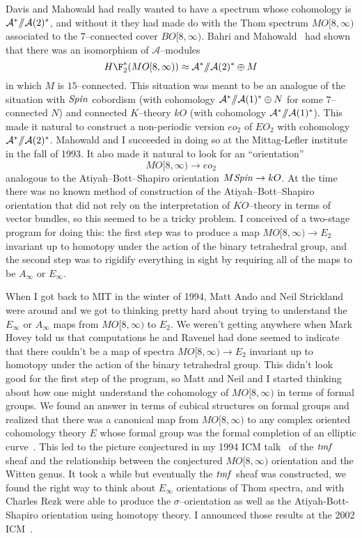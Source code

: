 Davis and Mahowald had really wanted to have a spectrum whose cohomology
is $\mathcal A^* /\!\!/ \mathcal A(2)^*$, and without it they had made do
with the Thom spectrum $MO[8, \infty)$ associated to the $7$--connected cover
$BO[8, \infty)$.  Bahri and Mahowald~\cite{BahriMahowald} had shown that
there was an isomorphism of $\mathcal A$--modules
\[
H\F_2^{\ast}(MO[8, \infty)) \approx \mathcal A^* \mmod \mathcal A(2)^* \oplus M
\]
in which $M$ is $15$--connected.  This situation was meant to be an
analogue of the situation with $\mathit{Spin}$ cobordism (with cohomology
$\mathcal A^* /\!\!/ \mathcal A(1)^* \oplus N$ for some $7$--connected $N$) and connected
$K$--theory $kO$ (with cohomology $\mathcal A^* /\!\!/ \mathcal A(1)^*$).  This made it
natural to construct a non-periodic version $eo_{2}$ of $EO_{2}$ with
cohomology $\mathcal A^* /\!\!/ \mathcal A(2)^*$.  Mahowald and I succeeded in doing so at
the Mittag-Lefler institute in the fall of 1993.  It also made it
natural to look for an ``orientation'' \[MO[8, \infty) \to eo_{2}\] analogous
to the Atiyah--Bott--Shapiro orientation $M\mathit{Spin} \to kO$.  At the time
there was no known method of construction of the Atiyah--Bott--Shapiro
orientation that did not rely on the interpretation of $KO$--theory in
terms of vector bundles, so this seemed to be a tricky problem.  I
conceived of a two-stage program for doing this: the first step was
to produce a map $MO[8, \infty) \to E_{2}$ invariant up to homotopy under
the action of the binary tetrahedral group, and the second step was to
rigidify everything in sight by requiring all of the maps to be
$A_{\infty}$ or $E_{\infty}$.

When I got back to MIT in the winter of 1994, Matt Ando and Neil
Strickland were around and we got to thinking pretty hard about trying
to understand the $E_{\infty}$ or $A_{\infty}$ maps from $MO[8, \infty)$ to
$E_{2}$.  We weren't getting anywhere when Mark Hovey told us that
computations he and Ravenel had done seemed to indicate that there
couldn't be a map of spectra $MO[8, \infty) \to E_{2}$ invariant up to
homotopy under the action of the binary tetrahedral group.  This
didn't look good for the first step of the program, so Matt and Neil
and I started thinking about how one might understand the cohomology
of $MO[8, \infty)$ in terms of formal groups.  We found an answer in terms
of cubical structures on formal groups and realized that there was a
canonical map from $MO[8, \infty)$ to any complex oriented cohomology
theory $E$ whose formal group was the formal completion of an elliptic
curve~\cite{AHSTheoremOfTheCube}.  This led to the picture
conjectured in my 1994 ICM talk~\cite{HopkinsICMZurich} of the
$\mathit{tmf}$ sheaf and the relationship between the conjectured $MO[8, \infty)$
orientation and the Witten genus.  It took a while but eventually the
$\mathit{tmf}$ sheaf was constructed, we found the right way to think about
$E_{\infty}$ orientations of Thom spectra, and with Charles Rezk were
able to produce the $\sigma$--orientation as well as the
Atiyah-Bott-Shapiro orientation using homotopy theory.  I announced
those results at the 2002 ICM~\cite{HopkinsICMBeijing}.

